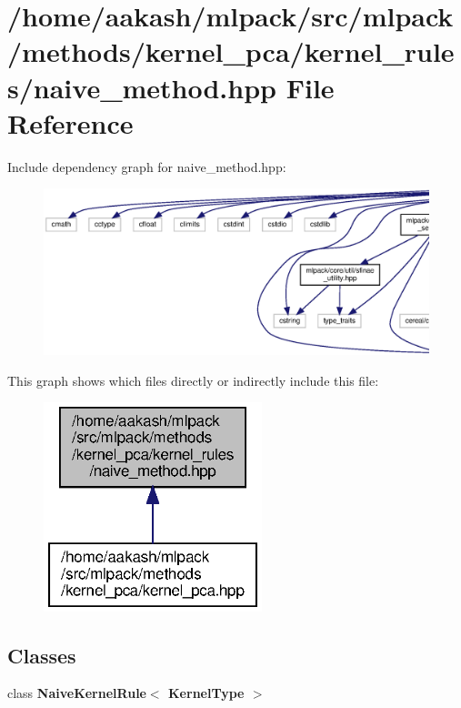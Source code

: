 \section{/home/aakash/mlpack/src/mlpack/methods/kernel\+\_\+pca/kernel\+\_\+rules/naive\+\_\+method.hpp File Reference}
\label{naive__method_8hpp}
Include dependency graph for naive\+\_\+method.\+hpp\+:
\nopagebreak
\begin{figure}[H]
\begin{center}
\leavevmode
\includegraphics[width=350pt]{naive__method_8hpp__incl}
\end{center}
\end{figure}
This graph shows which files directly or indirectly include this file\+:
\nopagebreak
\begin{figure}[H]
\begin{center}
\leavevmode
\includegraphics[width=180pt]{naive__method_8hpp__dep__incl}
\end{center}
\end{figure}
\subsection*{Classes}
\begin{DoxyCompactItemize}
\item 
class \textbf{ Naive\+Kernel\+Rule$<$ Kernel\+Type $>$}
\end{DoxyCompactItemize}
